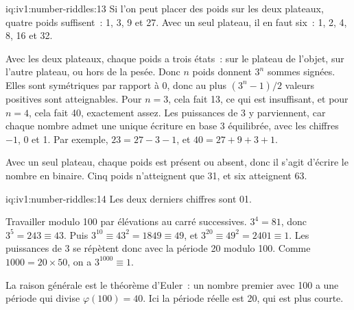 \begin{solution}{iq:iv1:number-riddles:13}
Si l'on peut placer des poids sur les deux plateaux, quatre poids suffisent~: 1, 3, 9 et 27. Avec un seul plateau, il en faut six~: 1, 2, 4, 8, 16 et 32.

Avec les deux plateaux, chaque poids a trois états~: sur le plateau de l'objet, sur l'autre plateau, ou hors de la pesée. Donc $n$ poids donnent $3^n$ sommes signées. Elles sont symétriques par rapport à 0, donc au plus $(3^n - 1)/2$ valeurs positives sont atteignables. Pour $n = 3$, cela fait 13, ce qui est insuffisant, et pour $n = 4$, cela fait 40, exactement assez. Les puissances de 3 y parviennent, car chaque nombre admet une unique écriture en base 3 équilibrée, avec les chiffres $-1$, 0 et 1. Par exemple, $23 = 27 - 3 - 1$, et $40 = 27 + 9 + 3 + 1$.

Avec un seul plateau, chaque poids est présent ou absent, donc il s'agit d'écrire le nombre en binaire. Cinq poids n'atteignent que 31, et six atteignent 63.

\end{solution}

\begin{solution}{iq:iv1:number-riddles:14}
Les deux derniers chiffres sont 01.

Travailler modulo 100 par élévations au carré successives. $3^4 = 81$, donc $3^5 = 243 \equiv 43$. Puis $3^{10} \equiv 43^2 = 1849 \equiv 49$, et $3^{20} \equiv 49^2 = 2401 \equiv 1$. Les puissances de 3 se répètent donc avec la période 20 modulo 100. Comme $1000 = 20 \times 50$, on a $3^{1000} \equiv 1$.

La raison générale est le théorème d'Euler~: un nombre premier avec 100 a une période qui divise $\varphi(100) = 40$. Ici la période réelle est 20, qui est plus courte.

\end{solution}

